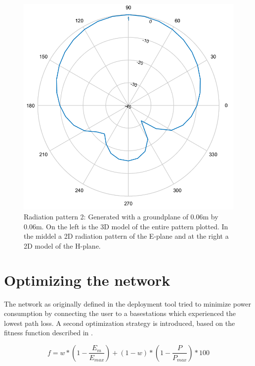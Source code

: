 \begin{figure}[!htb]
  \includegraphics[width=\linewidth]{../images/pattern1/hp.png}
\endminipage
  \caption{Radiation pattern 2: Generated with a groundplane of 0.06m by 0.06m. On the left is the 3D model of the entire pattern plotted. In the middel a 2D radiation pattern of the E-plane and at the right a 2D model of the H-plane.}
 \label{radpattern1}
\end{figure}

\section{Optimizing the network}
The network as originally defined in the deployment tool tried to minimize power consumption by connecting the user to a basestations which
experienced the lowest path loss. A second optimization strategy is introduced, based on the fitness function described in \cite{J1}.

\begin{equation} 
f = w * \left(1 - \frac{E_m}{E_{max}}\right) + (1 - w)*\left(1 - \frac{P}{P_{max}}\right) * 100
\label{eq:fitnessfunction}
\end{equation}

